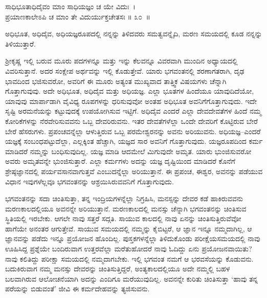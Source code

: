 \begin{shloka}
ಸಾಧಿಭೂತಾಧಿದೈವಂ ಮಾಂ ಸಾಧಿಯಜ್ಞಂ ಚ ಯೇ ವಿದುಃ~।\\ಪ್ರಯಾಣಕಾಲೇಽಪಿ ಚ ಮಾಂ ತೇ ವಿದುರ್ಯುಕ್ತಚೇತಸಃ \hfill॥ ೩೦~॥
\end{shloka}

\begin{artha}
ಅಧಿಭೂತ, ಅಧಿದೈವ, ಅಧಿಯಜ್ಞರೂಪದಲ್ಲಿ ನನ್ನನ್ನು ತಿಳಿದವರು ಸಮತ್ವವನ್ನೈದಿ, ಮರಣ ಸಮಯದಲ್ಲಿ ಕೂಡ ನನ್ನನ್ನು ತಿಳಿಯುತ್ತಾರೆ.
\end{artha}

ಶ‍್ರೀಕೃಷ್ಣ ಇಲ್ಲಿ ಬರುವ ಮೂರು ಪದಗಳನ್ನೂ ಮತ್ತು ಇನ್ನು ಕೆಲವನ್ನೂ ವಿವರವಾಗಿ ಮುಂದಿನ ಅಧ್ಯಾಯದಲ್ಲಿ ವಿವರಿಸುತ್ತಾನೆ. ಅದರ ಸಂಕ್ಷೇಪ ಅರ್ಥವನ್ನು ಇಲ್ಲಿ ಕೊಡುತ್ತೇವೆ. ಯಾರು ಭಗವಂತನಲ್ಲಿ ಶರಣಾಗತರಾಗಿ, ದೃಢ ಭಾವದಿಂದ ಭಜಿಸುವರೋ, ಅವರಿಗೆ ಈ ಮೂರು ಅತ್ಯಂತ ಮುಖ್ಯವಾದ ತಾತ್ತ್ವಿಕ ವಿಷಯಗಳು ಚೆನ್ನಾಗಿ ಗೊತ್ತಾಗುವುವು. ಅದೇ ಅಧಿಭೂತ, ಅಧಿದೈವ ಮತ್ತು ಅಧಿಯಜ್ಞ. ಎಲ್ಲಾ ಭೂತಗಳ ಹಿಂದೆಯೂ ಯಾವುದಿದೆಯೋ, ಯಾವುವು ಮಾರ್ಪಾಡಾಗಿ ವೈವಿಧ್ಯ ರೂಪಗಳನ್ನು ಧರಿಸುವುವೋ ಅಂತಹ ಅಧಿಭೂತ ಅವನಿಗೆ\break ಗೊತ್ತಾಗುವುದು. ಇದೇ ಸೃಷ್ಟಿ ಅರಮನೆಯನ್ನು ಕಟ್ಟುವುದಕ್ಕೆ ಉಪಯೋಗಿಸುವ ಇಟ್ಟಿಗೆ. ಅಧಿದೈವ ಎಂದರೆ ಎಲ್ಲಾ ದೇವದೇವತೆಗಳ ಹಿಂದೆ ನಮ್ಮ ಕೋರಿಕೆಗಳನ್ನು ನೆರವೇರಿಸುವವನು ಒಬ್ಬ ದೇವರಿರುವನು. ಇತರ ದೇವತೆಗಳೆಲ್ಲಾ ಒಂದೇ ದೇವರಿಗೆ ಕೊಟ್ಟಿರುವ ಬೇರೆ ಬೇರೆ ಹೆಸರುಗಳು. ಪ್ರಪಂಚವನ್ನೆಲ್ಲಾ ಆಳುತ್ತಿರುವ ಒಬ್ಬ ಪರಮೇಶ್ವರನನ್ನು ಅವನು ಅರಿಯುವನು. ಅಧಿಯಜ್ಞ–ಎಂದರೆ ಯಜ್ಞಕ್ಕೆ ಸಂಬಂಧಪಟ್ಟುದೆಲ್ಲಾ, ಎಲ್ಲಕ್ಕಿಂತ ಹೆಚ್ಚಾಗಿ, ಯಜ್ಞದ ಸಾರ ಅವನಿಗೆ ಗೊತ್ತಾಗುವುದು. ಯಜ್ಞರೂಪದಿಂದ ಕರ್ಮ ಮಾಡಿದರೆ ನಮ್ಮನ್ನು ಬಂಧಿಸುವುದಿಲ್ಲ. ಯಜ್ಞ ಮಾಡಿ ಆದಮೇಲೆ ಮಿಗುವುದೇ ಅಮೃತ. ಯಾರು ಭುಂಜಿಸುವರೋ ಅವರು ಅಮೃತವನ್ನೇ ಭುಂಜಿಸುತ್ತಾರೆ. ಎಲ್ಲಾ ಕರ್ಮಗಳು ಅದನ್ನು ಯಜ್ಞ ದೃಷ್ಟಿಯಿಂದ ಮಾಡಿದರೆ ಕೊನೆಗೆ ಶ್ರೇಷ್ಠಜ್ಞಾನದಲ್ಲಿ ಪರ್ಯವಸಾನವಾಗುತ್ತವೆ ಎಂಬುದನ್ನೆಲ್ಲಾ ಅರಿಯುತ್ತಾನೆ. ಈ ಪ್ರಪಂಚ, ಈಶ್ವರ, ಅವನನ್ನು ಪಡೆಯುವ ವಿಧಾನ ಇವುಗಳೆಲ್ಲವೂ ಭಗವಂತನನ್ನು ಆಶ್ರಯಿಸಿರುವವನಿಗೆ ಗೊತ್ತಾಗುವುದು.

ಭಗವಂತನನ್ನು ಸದಾ ಚಿಂತಿಸುತ್ತಾ, ತನ್ನ ಇಂದ್ರಿಯಗಳನ್ನೆಲ್ಲಾ ನಿಗ್ರಹಿಸಿ, ಮನಸ್ಸನ್ನು ದೇವರ ಕಡೆ ಹಾಕಿರುವವನು ಮರಣಕಾಲದಲ್ಲಿಯೂ ಅವನನ್ನೇ ಅರಿಯುತ್ತಾನೆ. ಮರಣಕಾಲದಲ್ಲಿ ಮನಸ್ಸು ಚೆನ್ನಾಗಿ ಭಗವಂತನನ್ನು ಚಿಂತಿಸುವ ಸ್ಥಿತಿಯಲ್ಲಿ ಇರಬೇಕು. ಆಗಲೇ ನಾವು ಸತ್ತರೆ ಸದ್ಗತಿ. ಸಾಯುವ ಕಾಲದಲ್ಲಿ ನಾವು ಏನನ್ನು ಚಿಂತಿಸುತ್ತಿರುವೆವೋ ಹಾಗೆಯೇ ಅನಂತರ ಆಗುತ್ತೇವೆ. ಸಾಯುವ ಸಮಯದಲ್ಲಿ ನಮ್ಮನ್ನು ಕೈಬಿಟ್ಟರೆ, ಆ ಜ್ಞಾನ ಇನ್ನೂ ನಮ್ಮದಾಗಿಲ್ಲ, ಆ ಜ್ಞಾನವನ್ನು ಪಡೆದು ಇನ್ನೂ ಪ್ರಯೋಜನ ಹೊಂದಿಲ್ಲ. ಪುಸ್ತಕಗಳನ್ನೆಲ್ಲಾ ತಿಳಿದುಕೊಂಡು ಪರೀಕ್ಷೆಯ\break ಸಮಯದಲ್ಲಿ ನಾವು ಊಹಿಸಿದ್ದ ಪ್ರಶ್ನೆಯೇ ಬಂದಿರುವಾಗ ಉತ್ತರವೆಲ್ಲಾ ಮರೆತುಹೋದರೆ ನಾವು ಓದಿದ್ದು ಏನು ಪ್ರಯೋಜನವಾಯಿತು? ನಾವು ಕಲಿತಿದ್ದು ಪರೀಕ್ಷಾ ಸಮಯದಲ್ಲಿ ನಮ್ಮದಾಗಬೇಕು. ಇಲ್ಲಿ ಭಗವಂತ ನಮಗೆ ಆ ಭರವಸೆಯನ್ನು ಕೊಡುವನು. ಬದುಕಿರುವಾಗ ನಮ್ಮ ಮನಸ್ಸು ದೇವರನ್ನು ಚಿಂತಿಸುತ್ತಿದ್ದರೆ, ಅಂತ್ಯಕಾಲದಲ್ಲಿಯೂ ಅದೇ ನಮ್ಮಲ್ಲಿ ಬಹಳ ಬಲವಾಗಿರುವ ಆಲೋಚನೆಯಾಗಿ ಅದನ್ನು ಎಂದಿಗೂ ಮರೆಯುವುದಿಲ್ಲ. ಅವನನ್ನೇ ಕುರಿತು ಚಿಂತಿಸುತ್ತಾ ‘ಹಾವು ತನ್ನ ಪರೆಯನ್ನು ಬಿಡುವಂತೆ’ ಜೀವಿ ಈ ಕರ್ಮದೇಹವನ್ನು ತ್ಯಜಿಸುವನು.

